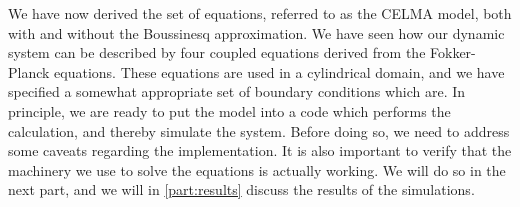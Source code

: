 We have now derived the set of equations, referred to as the CELMA model, both with and without the Boussinesq approximation.
We have seen how our dynamic system can be described by four coupled equations derived from the Fokker-Planck equations.
These equations are used in a cylindrical domain, and we have specified a somewhat appropriate set of boundary conditions which are.
In principle, we are ready to put the model into a code which performs the calculation, and thereby simulate the system.
Before doing so, we need to address some caveats regarding the implementation.
It is also important to verify that the machinery we use to solve the equations is actually working.
We will do so in the next part, and we will in \cref{part:results} discuss the results of the simulations.
